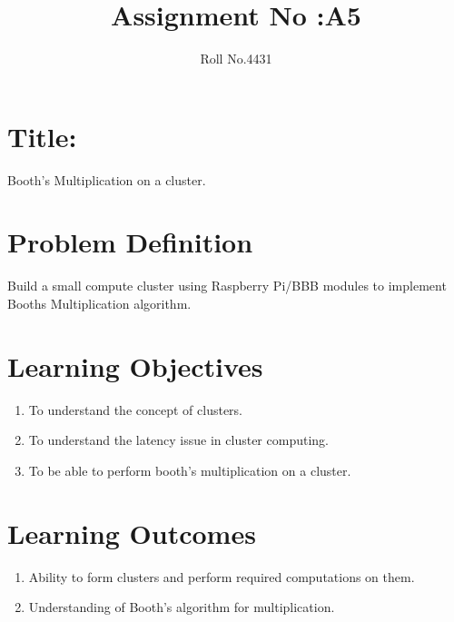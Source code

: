 \documentclass[10pt,a4paper]{article}
\title{Assignment No :A5}
\date{}
\author{Roll No.4431}
\begin{document}
\maketitle
\section{Title:}
Booth's Multiplication on a cluster.

\section{Problem Definition}
Build a small compute cluster using Raspberry Pi/BBB modules to implement Booths Multiplication
algorithm.

\section{Learning Objectives}
\begin{enumerate}
\item To understand the concept of clusters.
\item To understand the latency issue in cluster computing.
\item To be able to perform booth's multiplication on a cluster.
\end{enumerate}

\section{Learning Outcomes}
\begin{enumerate}
\item Ability to form clusters and perform required computations on them.
\item Understanding of Booth's algorithm for multiplication.
\end{enumerate}
\end{document}
